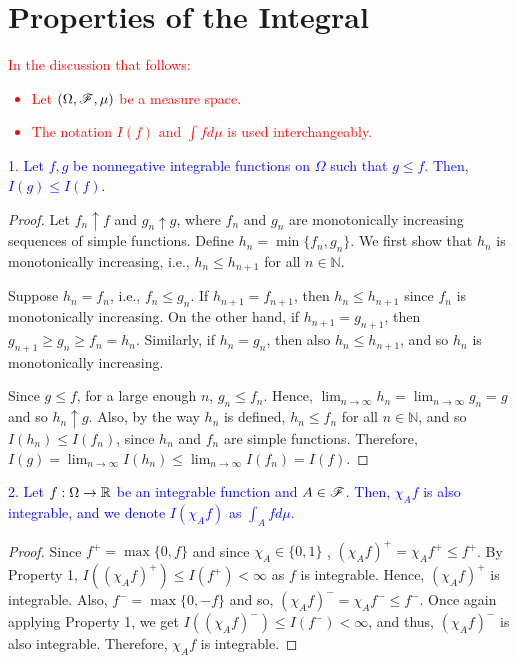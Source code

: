 \section{Properties of the Integral}

\textcolor{red}{
In the discussion that follows:
\begin{itemize}
    \item Let $(\Omega, \mathscr{F}, \mu)$ be a measure space.
    \item The notation $I(f)$ and $\int f d\mu$ is used interchangeably. 
\end{itemize}}

\textcolor{blue}{1. Let $f, g$ be nonnegative integrable functions on $\Omega$ such that $g \leq f$. Then, $I(g) \leq I(f)$.
}

\begin{proof}
Let $f_n \uparrow f$ and $g_n \uparrow g$, where $f_n$ and $g_n$ are monotonically increasing sequences of simple functions. Define $h_n = \min\{f_n, g_n\}$. We first show that $h_n$ is monotonically increasing, i.e., $h_n \leq h_{n + 1}$ for all $n \in \mathbb{N}$. 

Suppose $h_n = f_n$, i.e., $f_n \leq g_n$. If $h_{n + 1} = f_{n + 1}$, then $h_n \leq h_{n + 1}$ since $f_n$ is monotonically increasing. On the other hand, if $h_{n + 1} = g_{n + 1}$, then $g_{n + 1} \geq g_n \geq f_n = h_n$. Similarly, if $h_n = g_n$, then also $h_{n} \leq h_{n + 1}$, and so $h_n$ is monotonically increasing.

Since $g \leq f$, for a large enough $n$, $g_n \leq f_n$. Hence, $\lim_{n \to \infty} h_n = \lim_{n \to \infty} g_n = g$ and so $h_n \uparrow g$. Also, by the way $h_n$ is defined, $h_n \leq f_n$ for all $n \in \mathbb{N}$, and so $I(h_n) \leq I(f_n)$, since $h_n$ and $f_n$ are simple functions. Therefore, $I(g) = \lim_{n \to \infty} I(h_n) \leq \lim_{n \to \infty} I(f_n) = I(f)$.
\end{proof}

\textcolor{blue}{2. Let $f: \Omega \to \mathbb{R}$ be an integrable function and $A \in \mathscr{F}$. Then, $\chi_Af$ is also integrable, and we denote $I(\chi_Af)$ as $\int_A f d\mu.$}

\begin{proof}
    Since $f^+ = \max\{0, f\}$ and since $\chi_A \in \{0, 1\}$ , $(\chi_Af)^+ = \chi_A f^+ \leq f^+$. By Property 1, $I((\chi_Af)^+) \leq I(f^+)< \infty$ as $f$ is integrable. Hence, $(\chi_Af)^+$ is integrable. Also, $f^- = \max\{0, - f\}$ and so, $(\chi_Af)^- = \chi_A f^- \leq f^-$. Once again applying Property 1, we get $I((\chi_Af)^-) \leq I(f^-) < \infty$, and thus, $(\chi_Af)^-$ is also integrable. Therefore, $\chi_Af$ is integrable.
\end{proof}

